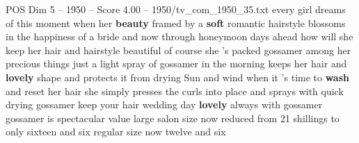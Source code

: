 \begin{textsample}{POS Dim 5 – 1950 – Score 4.00 – 1950/tv\_com\_1950\_35.txt}  \label{ex:f5_pos_046}
every girl dreams of this moment when her \textbf{beauty} framed by a \textbf{soft} romantic hairstyle blossoms in the happiness of a bride and now through honeymoon days ahead how will she keep her hair and hairstyle beautiful of course she 's packed gossamer among her precious things just a light spray of gossamer in the morning keeps her hair and \textbf{lovely} shape and protects it from drying Sun and wind when it 's time to \textbf{wash} and reset her hair she simply presses the curls into place and sprays with quick drying gossamer keep your hair wedding day \textbf{lovely} always with gossamer gossamer is spectacular value large salon size now reduced from 21 shillings to only sixteen and six regular size now twelve and six

\end{textsample}
